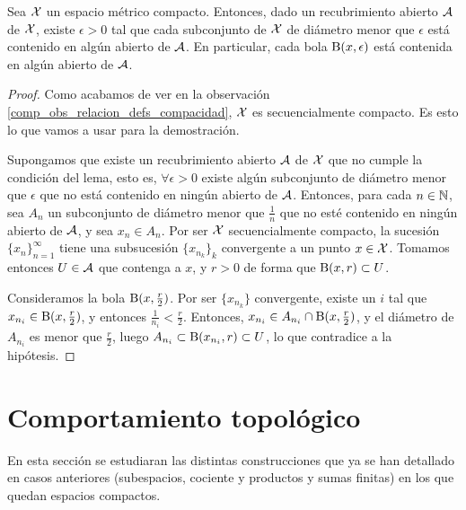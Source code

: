 \begin{lem}[Lebesgue]
	\label{comp_lema_lebesgue}
	Sea $\mathcal{X}$ un espacio métrico compacto. Entonces, dado un recubrimiento abierto $\mathcal{A}$ de $\mathcal{X}$, existe $\epsilon>0$ tal que cada subconjunto de $\mathcal{X}$ de diámetro menor que $\epsilon$ está contenido en algún abierto de $\mathcal{A}$. En particular, cada bola $\operatorname{B}(x,\epsilon)$ está contenida en algún abierto de $\mathcal{A}$.

	\begin{proof}
		Como acabamos de ver en la observación \ref{comp_obs_relacion_defs_compacidad}, $\mathcal{X}$ es secuencialmente compacto. Es esto lo que vamos a usar para la demostración.
	
		Supongamos que existe un recubrimiento abierto $\mathcal{A}$ de $\mathcal{X}$ que no cumple la condición del lema, esto es, $\forall\epsilon > 0$ existe algún subconjunto de diámetro menor que $\epsilon$ que no está contenido en ningún abierto de $\mathcal{A}$. Entonces, para cada $n\in\mathbb{N}$, sea $A_n$ un subconjunto de diámetro menor que $\frac{1}{n}$ que no esté contenido en ningún abierto de $\mathcal{A}$, y sea $x_n\in A_n$. Por ser $\mathcal{X}$ secuencialmente compacto, la sucesión $\{x_n\}_{n=1}^\infty$ tiene una subsucesión $\{x_{n_k}\}_k$ convergente a un punto $x\in\mathcal{X}$. Tomamos entonces $U\in\mathcal{A}$ que contenga a $x$, y $r>0$ de forma que $\operatorname{B}(x,r)\subset U$.

		Consideramos la bola $\operatorname{B}(x,\frac{r}{2})$. Por ser $\{x_{n_k}\}$ convergente, existe un $i$ tal que $x_{n_i}\in\operatorname{B}(x,\frac{r}{2})$, y entonces $\frac{1}{n_i}<\frac{r}{2}$. Entonces, $x_{n_i}\in A_{n_i}\cap\operatorname{B}(x,\frac{r}{2})$, y el diámetro de $A_{n_i}$ es menor que $\frac{r}{2}$, luego $A_{n_i}\subset\operatorname{B}(x_{n_i},r)\subset U$, lo que contradice a la hipótesis.
	\end{proof}
\end{lem}


\section{Comportamiento topológico}

En esta sección se estudiaran las distintas construcciones que ya se han detallado en casos anteriores (subespacios, cociente y productos y sumas finitas) en los que quedan espacios compactos. 

